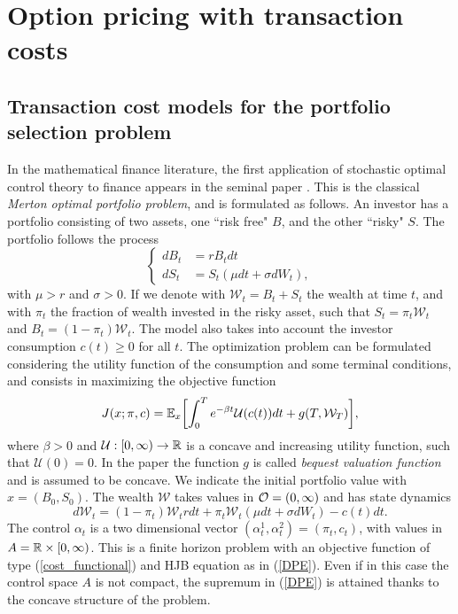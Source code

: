 

\chapter{Option pricing with transaction costs}\label{Chapter5}
\minitoc%

\vspace{5em}

\section{Transaction cost models for the portfolio selection problem}
In the mathematical finance literature, the first application of stochastic optimal control theory to finance appears in the seminal paper \cite{Me69}.
This is the classical \emph{Merton optimal portfolio problem}, and is formulated as follows. An investor has a portfolio consisting of two assets, one ``risk free" $B$,
and the other ``risky" $S$. The portfolio follows the process
\begin{equation}\label{Merton_problem1}
 \begin{cases}
 dB_t &=  rB_t dt \\
 dS_t &=  S_t \left( \mu dt + \sigma dW_t \right),
\end{cases}
\end{equation} 
with $\mu>r$ and $\sigma>0$. If we denote with $\mathcal{W}_t = B_t + S_t$  the wealth at time $t$, and with $\pi_t$ the fraction of wealth invested in the risky asset, such that
$S_t = \pi_t \mathcal{W}_t$ and $B_t = (1-\pi_t) \mathcal{W}_t$. The model also takes into account the investor consumption $c(t) \geq 0$ for all $t$. 
The optimization problem can be formulated considering the utility function of the consumption and some terminal conditions, and consists in maximizing the objective function
\begin{equation}
 J(x;\pi,c) = \mathbb{E}_x \biggl[ \int_0^{T} e^{-\beta t} \mathcal{U}(c(t)) dt + g(T,\mathcal{W}_T) \biggr],
\end{equation}
where $\beta > 0$ and $\mathcal{U}: [0,\infty) \to \mathbb{R}$ is a concave and increasing utility function, such that $\mathcal{U}(0)=0$.
In the paper the function $g$ is called \emph{bequest valuation function} and is assumed to be concave.
We indicate the initial portfolio value with $x = (B_0,S_0)$. 
The wealth $\mathcal{W}$ takes values in $\mathcal{O} = (0,\infty)$ and has state dynamics
\begin{equation}
 d \mathcal{W}_t = (1-\pi_t) \mathcal{W}_t r dt + \pi_t \mathcal{W}_t (\mu dt + \sigma dW_t) - c(t)dt.
\end{equation}
The control $\alpha_t$ is a two dimensional vector $(\alpha^1_t,\alpha^2_t) = (\pi_t,c_t)$, with values in $A = \mathbb{R} \times [0,\infty)$. 
This is a finite horizon problem with an objective function of type (\ref{cost_functional})
and HJB equation as in (\ref{DPE}). 
Even if in this case the control space $A$ is not compact, the supremum in (\ref{DPE}) is attained thanks to the concave structure of the problem.

